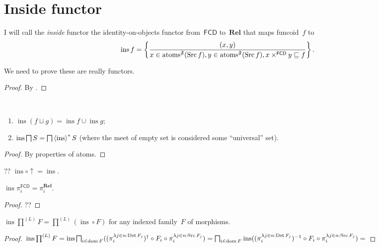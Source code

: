 \chapter{Inside functor}

\begin{defn}
I will call the \emph{inside} functor the identity-on-objects functor from~$\mathsf{FCD}$ to~$\mathbf{Rel}$ that maps
funcoid~$f$ to
\[
\operatorname{ins} f =
\left\{ \frac{(x,y)}{x\in\operatorname{atoms}^{\mathfrak{F}}(\operatorname{Src} f), y\in\operatorname{atoms}^{\mathfrak{F}}(\operatorname{Src} f), x\times^{\mathsf{FCD}}y\sqsubseteq f}\right\}. \]
\end{defn}

We need to prove these are really functors.

\begin{proof}
By \cite[proposition~]{volume-1}.
\end{proof}

\begin{prop}
~
\begin{enumerate}
\item $\operatorname{ins}(f\sqcup g)=\operatorname{ins}f\cup\operatorname{ins}g$;
\item $\operatorname{ins}\bigsqcap S=\bigsqcap\left\langle \operatorname{ins}\right\rangle ^{\ast}S$ (where the meet of empty set is considered some ``universal'' set).
\end{enumerate}
\end{prop}

\begin{proof}
By properties of atoms.
\end{proof}

\begin{prop}
?? $\operatorname{ins}\circ\uparrow = \operatorname{ins}$.
\end{prop}

\begin{prop}
$\operatorname{ins}\pi^{\mathsf{FCD}}_i=\pi^{\mathbf{Rel}}_i$.
\end{prop}

\begin{proof}
??
\end{proof}


\begin{prop}
$\operatorname{ins}\prod^{(L)}F =
\prod^{(L)}(\operatorname{ins}\circ F)$ for any indexed family~$F$ of morphisms.
\end{prop}

\begin{proof}
$\operatorname{ins}\prod^{(L)}F =
\operatorname{ins}\bigsqcap_{i \in \operatorname{dom} F} ((\pi^{\lambda j \in n :
\operatorname{Dst} F_j}_i)^{\dagger} \circ F_i \circ \pi^{\lambda j \in n :
\operatorname{Src} F_j}_i) =
\bigsqcap_{i \in \operatorname{dom} F}\operatorname{ins} ((\pi^{\lambda j \in n :
\operatorname{Dst} F_j}_i)^{-1} \circ F_i \circ \pi^{\lambda j \in n :
\operatorname{Src} F_j}_i) =
$
\end{proof}